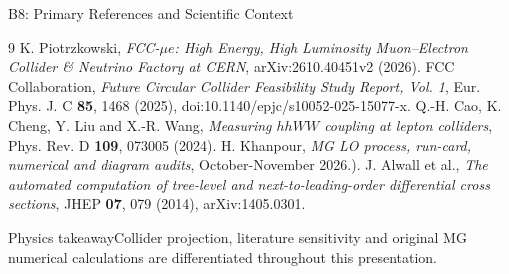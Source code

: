 \documentclass[aspectratio=1610,english]{beamer}
\newcommand{\src}[1]{\vfill{\par\color{black!65}\fontsize{6.4}{7.4}\selectfont\emph{Source:} #1\par}}
\newcommand{\key}[1]{\begin{alertblock}{Physics takeaway}\small  #1\end{alertblock}}
\begin{document}
\begin{frame}[t]{B8: Primary References and Scientific Context}
\scriptsize

\begin{thebibliography}{9}
\justifying 
\scriptsize
{} K. Piotrzkowski, \emph{FCC-$\mu e$: High Energy, High Luminosity Muon--Electron Collider \& Neutrino Factory at CERN}, arXiv:2610.40451v2 (2026).
 FCC Collaboration, \emph{Future Circular Collider Feasibility Study Report, Vol. 1}, Eur. Phys. J. C \textbf{85}, 1468 (2025), doi:10.1140/epjc/s10052-025-15077-x.
 Q.-H. Cao, K. Cheng, Y. Liu and X.-R. Wang, \emph{Measuring $hhWW$ coupling at lepton colliders}, Phys. Rev. D \textbf{109}, 073005 (2024).
 H. Khanpour, \emph{MG LO process, run-card, numerical and diagram audits}, October-November 2026.).
 J. Alwall et al., \emph{The automated computation of tree-level and next-to-leading-order differential cross sections}, JHEP \textbf{07}, 079 (2014), arXiv:1405.0301.
\end{thebibliography}

\key{\justifying Collider projection, literature sensitivity and original MG  numerical calculations are differentiated throughout this presentation.}


\end{frame}
\end{document}
